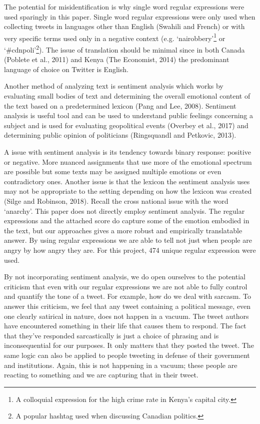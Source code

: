 \documentclass[12pt]{article}
\begin{document}
\begin{spacing}{1.5}
The potential for misidentification is why single word regular expressions were used sparingly in this paper. Single word regular expressions were only used when collecting tweets in languages other than English (Swahili and French) or with very specific terms used only in a negative context (e.g. `nairobbery'\footnote{A colloquial expression for the high crime rate in Kenya's capital city.} or `\#cdnpoli'\footnote{A popular hashtag used when discussing Canadian politics.}). The issue of translation should be minimal since in both Canada (Poblete et al., 2011) and Kenya (The Economist, 2014) the predominant language of choice on Twitter is English. 

Another method of analyzing text is sentiment analysis which works by evaluating small bodies of text and determining the overall emotional content of the text based on a predetermined lexicon (Pang and Lee, 2008). Sentiment analysis is useful tool and can be used to understand public feelings concerning a subject and is used for evaluating geopolitical events (Overbey et al., 2017) and determining public opinion of politicians (Ringsquandl and Petkovic, 2013). 

A issue with sentiment analysis is its tendency towards binary response: positive or negative. More nuanced assignments that use more of the emotional spectrum are possible but some texts may be assigned multiple emotions or even contradictory ones. Another issue is that the lexicon the sentiment analysis uses may not be appropriate to the setting depending on how the lexicon was created (Silge and Robinson, 2018). Recall the cross national issue with the word `anarchy'. This paper does not directly employ sentiment analysis. The regular expressions and the attached score do capture some of the emotion embodied in the text, but our approaches gives a more robust and empirically translatable answer. By using regular expressions we are able to tell not just when people are angry by how angry they are. For this project, 474 unique regular expression were used.  

By not incorporating sentiment analysis, we do open ourselves to the potential criticism that even with our regular expressions we are not able to fully control and quantify the tone of a tweet. For example, how do we deal with sarcasm. To answer this criticism, we feel that any tweet containing a political message, even one clearly satirical in nature, does not happen in a vacuum. The tweet authors have encountered something in their life that causes them to respond. The fact that they've responded sarcastically is just a choice of phrasing and is inconsequential for our purposes. It only matters that they posted the tweet. The same logic can also be applied to people tweeting in defense of their government and institutions. Again, this is not happening in a vacuum; these people are reacting to something and we are capturing that in their tweet.


\end{spacing}
\end{document}
